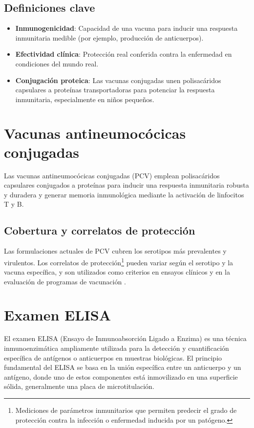 \subsection{Definiciones clave}
\begin{itemize}
    \item \textbf{Inmunogenicidad}: Capacidad de una vacuna para inducir una respuesta inmunitaria medible (por ejemplo, producción de anticuerpos).
    \item \textbf{Efectividad clínica}: Protección real conferida contra la enfermedad en condiciones del mundo real.
    \item \textbf{Conjugación proteica}: Las vacunas conjugadas unen polisacáridos capsulares a proteínas transportadoras para potenciar la respuesta inmunitaria, especialmente en niños pequeños.
\end{itemize}

\section{Vacunas antineumocócicas conjugadas}


Las vacunas antineumocócicas conjugadas (PCV) emplean polisacáridos capsulares conjugados a proteínas para inducir una respuesta inmunitaria robusta y duradera y generar memoria inmunológica mediante la activación de linfocitos T y B.


\subsection{Cobertura y correlatos de protección}
Las formulaciones actuales de PCV cubren los serotipos más prevalentes y virulentos. Los correlatos de protección\footnote{Mediciones de parámetros inmunitarios que permiten predecir el grado de protección contra la infección o enfermedad inducida por un patógeno.} pueden variar según el serotipo y la vacuna específica, y son utilizados como criterios en ensayos clínicos y en la evaluación de programas de vacunación \cite{Snedecor2020a}.

\section{Examen ELISA}

El examen ELISA (Ensayo de Inmunoabsorción Ligado a Enzima) es una técnica inmunoenzimática ampliamente utilizada para la detección y cuantificación específica de antígenos o anticuerpos en muestras biológicas. El principio fundamental del ELISA se basa en la unión específica entre un anticuerpo y un antígeno, donde uno de estos componentes está inmovilizado en una superficie sólida, generalmente una placa de microtitulación.


